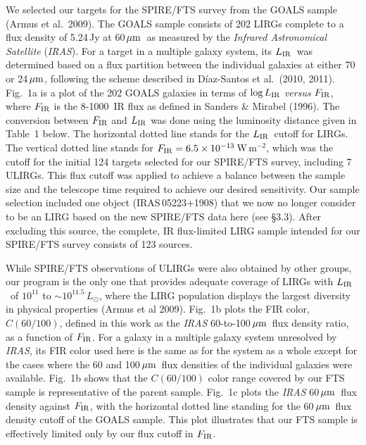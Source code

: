 \documentclass[preprint]{aastex}
\newcommand{\um}{\mbox{$\,\mu{\rm m}$}}
\newcommand{\IRAS}{{\it IRAS}}
\newcommand{\LIR}{\mbox{$L_{\rm IR}$}}
\begin{document}
We selected our targets for the SPIRE/FTS survey from the GOALS sample (Armus et
al.~2009). The GOALS sample consists of 202 LIRGs complete to a flux density of 
5.24\,Jy at 60\um\, as measured by the {\it Infrared Astronomical Satellite} 
(\IRAS).  For a target in a multiple galaxy system, its \LIR\ was determined 
based on a flux partition between the individual galaxies at either 70 or 24\um,
following the scheme described in D\'iaz-Santos et al.~(2010, 2011).
Fig.~1a is a plot of the 202 GOALS 
galaxies in terms of $\log L_{\rm IR}$ {\it versus} $F_{\rm IR}$,  where 
$F_{\rm IR}$ is the 8-1000\micron\ IR flux as defined in Sanders \& Mirabel 
(1996).  The conversion between $F_{\rm IR}$ and $L_{\rm IR}$ was done using 
the luminosity distance given in Table~1 below.
The horizontal dotted line stands for the \LIR\ cutoff for LIRGs. 
The vertical dotted line stands for $F_{\rm IR} = 6.5\times 10^{-13}\,$W\,m$^{-2}$,
which was the cutoff for the initial 124 targets selected for our SPIRE/FTS 
survey, including 7 ULIRGs. 
This flux cutoff was applied to achieve a balance between the sample size and
the telescope time required to achieve our desired sensitivity.
Our sample selection included one object (IRAS\,05223+1908) that we now no longer
consider to be an LIRG based on the new SPIRE/FTS data here (see \S3.3). 
After excluding this source, the complete, IR flux-limited LIRG sample intended 
for our SPIRE/FTS survey consists of 123 sources.


While SPIRE/FTS observations of 
ULIRGs were also obtained by other groups, our program is the only one that provides 
adequate coverage of LIRGs with \LIR\ of $10^{11}$ to $\sim 10^{11.5}\,L_{\odot}$, 
where the LIRG population displays the largest diversity in physical properties (Armus 
et al 2009).  Fig.~1b plots the FIR color, $C(60/100)$, defined in this work as
the {\it IRAS} 60-to-100\um\ flux density ratio, as a function of $F_{\rm IR}$. 
For a galaxy in a multiple galaxy system unresolved by \IRAS, its FIR color used
here is the same as for the system as a whole except for the cases where the 60 
and 100\um\ flux densities of the individual galaxies were available.  
Fig.~1b shows that the $C(60/100)$ color range covered by our FTS sample is representative
of the parent sample.  Fig.~1c plots the {\it IRAS} 60\um\ flux density against 
$F_{\rm IR}$, with the horizontal dotted line standing for the 60\um\ flux density 
cutoff of the GOALS sample. This plot illustrates that our FTS sample is effectively 
limited only by our flux cutoff in $F_{\rm IR}$.
\end{document}
